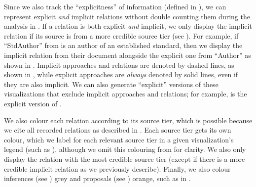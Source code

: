     
    \ExampleSynGraph{}

    \label{visExplicit}
    Since we also track the ``explicitness'' of information (defined in
    ), we can represent explicit \emph{and} implicit
    relations without double counting them during the analysis in
    . If a relation is both explicit \emph{and} implicit,
    we only display the implicit relation if its source is from a more
    credible source tier (see ). For example, if
    ``StdAuthor'' from  is an author of an
    established standard, then we display the implicit relation from their
    document alongside the explicit one from ``Author'' as shown in
    .
    Implicit approaches and relations are denoted by dashed lines, as shown in
    , while explicit approaches are
    \emph{always} denoted by solid lines, even if they are also implicit. We
    can also generate ``explicit'' versions of these visualizations that exclude
    implicit approaches and relations; for example, 
    is the explicit version of . %

    We also colour each relation according to its source tier, which is
    possible because we cite all recorded relations as described in
    . Each source tier gets its own colour, which we label
    for each relevant source tier in a given visualization's legend
    (such as ), although we omit this
    colouring from  for
    clarity. We also only display the relation with the most credible source
    tier (except if there is a more credible implicit relation as we previously
    describe). Finally, we also colour inferences (see ) grey and
    proposals (see ) orange, such as in \recFigs{}.

